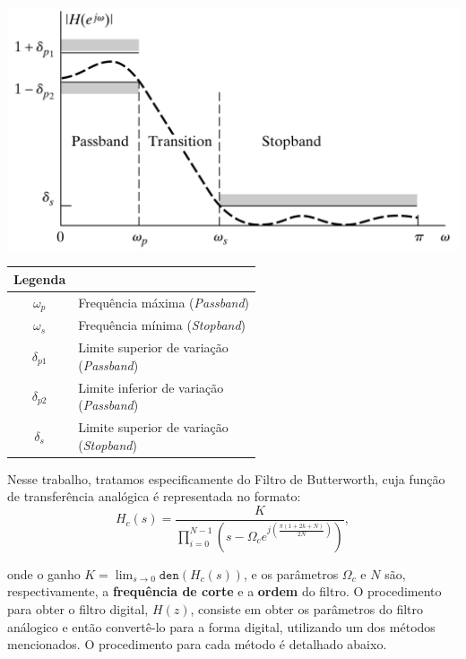\documentclass[a4paper,11pt]{article}
\numberwithin{figure}{section}
\numberwithin{equation}{section}
\numberwithin{table}{section}
\theoremstyle{definition}
\begin{document}
\vskip0.3cm
\noindent \begin{minipage}{\textwidth} \centering
	\begin{minipage}{0.49\textwidth}
		\centering
		\includegraphics[width=\textwidth]{lowpass.png}
	\end{minipage}
	\hfill
	\begin{minipage}{0.49\textwidth}
		\begin{tabular}{c l}
			\textbf{Legenda} &  \\
			\hline
			$\omega_p$ & Frequência máxima (\textit{Passband}) \\
			$\omega_s$ & Frequência mínima (\textit{Stopband}) \\
			$\delta_{p1}$ & \makecell{Limite superior de variação\\(\textit{Passband})} \\
			$\delta_{p2}$ & \makecell{Limite inferior de variação\\(\textit{Passband})} \\
			$\delta_{s}$ & \makecell{Limite superior de variação\\(\textit{Stopband})}
		\end{tabular}
	\end{minipage}
\end{minipage}
\vskip0.3cm

Nesse trabalho, tratamos especificamente do Filtro de Butterworth, cuja função de transferência analógica é representada no formato:
\begin{equation} \label{eq:butter}
    H_c(s) = \frac{K}{\displaystyle\prod_{i=0}^{N-1} \left( s - \Omega_c e^{j\left( \frac{\pi(1+2k+N)}{2N} \right)} \right)}	
,\end{equation}

\noindent onde o ganho $K = \lim_{s \to 0} \texttt{den}(H_c(s))$, e os parâmetros $\Omega_c$ e $N$ são, respectivamente, a \textbf{frequência de corte} e a \textbf{ordem} do filtro. O procedimento para obter o filtro digital, $H(z)$, consiste em obter os parâmetros do filtro análogico e então convertê-lo para a forma digital, utilizando um dos métodos mencionados. O procedimento para cada método é detalhado abaixo.
\end{document}
